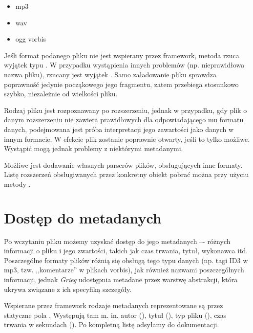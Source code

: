 \begin{itemize}
  \item mp3
  \item wav
  \item ogg vorbis
\end{itemize}

Jeśli format podanego pliku nie jest wspierany przez framework, metoda  rzuca wyjątek
typu . W przypadku wystąpienia innych problemów (np.  nieprawidłowa
nazwa pliku), rzucany jest wyjątek . Samo załadowanie pliku sprawdza poprawność
jedynie począkowego jego fragmentu, zatem przebiega stosunkowo szybko, niezależnie od wielkości
pliku.

\begin{Tip}
Rodzaj pliku jest rozpoznawany po rozszerzeniu, jednak w przypadku, gdy plik o danym rozszerzeniu
nie zawiera prawidłowych dla odpowiadającego mu formatu danych, podejmowana jest próba interpretacji
jego zawartości jako danych w innym formacie. W efekcie plik zostanie poprawnie otwarty, jeśli to
tylko możliwe. Wystąpić mogą jednak problemy z niektórymi metadanymi.
\end{Tip}

\begin{Note}
Możliwe jest dodawanie własnych parserów plików, obsługujących inne formaty. Listę rozszerzeń
obsługiwanych przez konkretny obiekt  pobrać można przy użyciu metody
.
\end{Note}


\section{Dostęp do metadanych}

Po wczytaniu pliku możemy uzyskać dostęp do jego metadanych –- różnych informacji o pliku i jego
zwartości, takich jak czas trwania, tytuł, wykonawca itd. Poszczególne formaty plików różnią się
obsługą tego typu danych (np. tagi ID3 w mp3, tzw. ,,komentarze'' w plikach vorbis), jak również
nazwami poszczególnych informacji, jednak \emph{Grieg} udostępnia metadane przez warstwę abstrakcji,
która ukrywa związane z ich specyfiką szczegóły.

Wspierane przez framework rodzaje metadanych reprezentowane są przez statyczne pola
. Występują tam m. in. autor (), tytuł (), typ pliku
(), czas trwania w sekundach (). Po kompletną listę odsyłamy do
dokumentacji.

